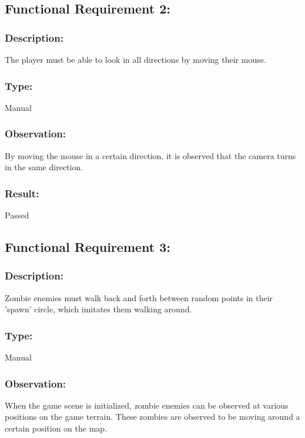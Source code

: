\documentclass[12pt, titlepage]{article}
\begin{document}
\subsection{Functional Requirement 2: } 

\subsubsection{Description: }The player must be able to look in all directions by moving their mouse.

\subsubsection{Type: } Manual

\subsubsection{Observation: } By moving the mouse in a certain direction, it is observed that the camera turns in the same direction.

\subsubsection[Pass / Fail:] {Result: } Passed


\subsection{Functional Requirement 3: } 

\subsubsection{Description: }Zombie enemies must walk back and forth between random points in their 'spawn' circle, which imitates them walking around.

\subsubsection{Type: } Manual

\subsubsection{Observation: } When the game scene is initialized, zombie enemies can be observed at various positions on the game terrain. These zombies are observed to be moving around a certain position on the map.
\end{document}

